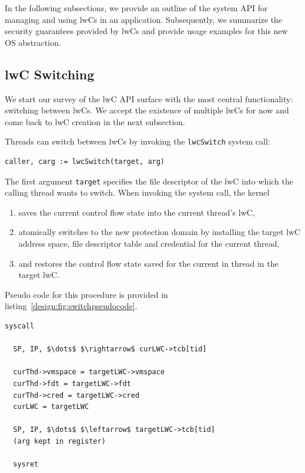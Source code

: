 \documentclass[10pt,twocolumn,letter]{article}
\begin{document}
In the following subsections, we provide an outline of the system API for managing and using lwCs in an application.
Subsequently, we summarize the security guarantees provided by lwCs and provide usage examples for this new OS abstraction. 

\subsection{lwC Switching}\label{design:switching}
We start our survey of the lwC API surface with the most central functionality: switching between lwCs.
We accept the existence of multiple lwCs for now and come back to lwC creation in the next subsection.

Threads can switch between lwCs by invoking the \lstinline{lwcSwitch} system call:

\begin{lstlisting}[float=h]
  caller, carg := lwcSwitch(target, arg) 
\end{lstlisting}

The first argument \lstinline{target} specifies the file descriptor of the lwC into which the calling thread wants to switch.
When invoking the system call, the kernel
\begin{enumerate}[label=(\alph*)]
\item saves the current control flow state into the current thread's lwC,
\item atomically switches to the new protection domain by installing the target lwC address space, file descriptor table and credential for the current thread,
\item and restores the control flow state saved for the current in thread in the target lwC.
\end{enumerate}
Pseudo code for this procedure is provided in listing~\ref{design:fig:switchpseudocode}.

\begin{lstlisting}[mathescape,label=design:fig:switchpseudocode,caption=Pseudo code for lwcSwitch.,frame=trbl]
  syscall
  
  SP, IP, $\dots$ $\rightarrow$ curLWC->tcb[tid]
  
  curThd->vmspace = targetLWC->vmspace
  curThd->fdt = targetLWC->fdt
  curThd->cred = targetLWC->cred
  curLWC = targetLWC
  
  SP, IP, $\dots$ $\leftarrow$ targetLWC->tcb[tid]
  (arg kept in register)
  
  sysret  
\end{lstlisting}
  
\end{document}
